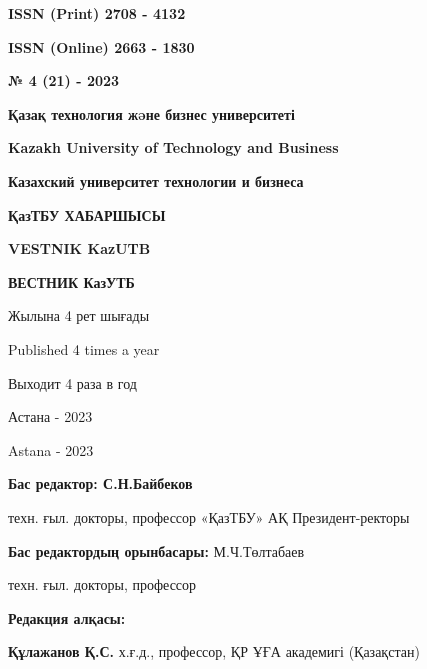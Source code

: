 \begin{flushright}
{\bfseries ISSN (Print) 2708 - 4132}

{\bfseries ISSN (Online) 2663 - 1830}

\vspace{1cm}

{\bfseries № 4 (21) - 2023}
\end{flushright}

\vfill

\begin{center}
{\bfseries \large Қазақ технология жəне бизнес университеті}

\vspace{0.3cm}

{\bfseries \large Kazakh University of Technology and Business}

\vspace{0.3cm}

{\bfseries \large Казахский университет технологии и бизнеса}

\vfill

{\bfseries \huge ҚазТБУ ХАБАРШЫСЫ}

\vspace{0.5cm}

{\bfseries \huge VESTNIK KazUTB}

\vspace{0.5cm}

{\bfseries \huge ВЕСТНИК КазУТБ}

\vfill

Жылына 4 рет шығады

Published 4 times a year

Выходит 4 раза в год

\vfill

Астана - 2023

Astana - 2023
\end{center}

\pagebreak

\begin{center}
{\bfseries Бас редактор: С.Н.Байбеков}

техн. ғыл. докторы, профессор «ҚазТБУ» АҚ Президент-ректоры

{\bfseries Бас редактордың орынбасары:} М.Ч.Төлтабаев

техн. ғыл. докторы, профессор

{\bfseries Редакция алқасы:}
\end{center}

{\bfseries Құлажанов Қ.С.} х.ғ.д., профессор, ҚР ҰҒА академигі (Қазақстан)

